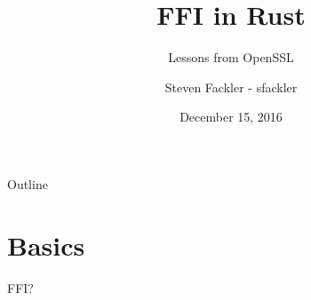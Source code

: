 \documentclass{beamer}
\title{FFI in Rust}
\subtitle{Lessons from OpenSSL}
\author[sfackler]{Steven Fackler - sfackler}
\date{December 15, 2016}
\begin{document}

\begin{frame}
    \titlepage
\end{frame}

\begin{frame}{Outline}
    \tableofcontents
\end{frame}

\section{Basics}

\begin{frame}{FFI?}
\end{frame}
\end{document}
